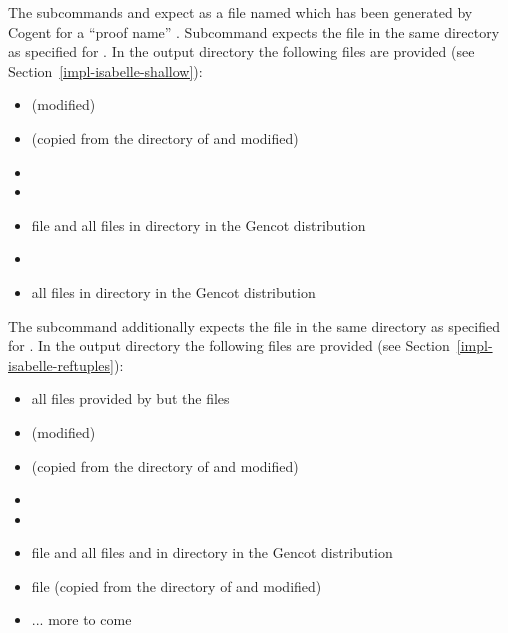 The subcommands  and  expect as  a file named  
which has been generated
by Cogent for a ``proof name'' . Subcommand  expects the file  in the same directory 
as specified for . In the output directory the following files are provided (see Section~\ref{impl-isabelle-shallow}):
\begin{itemize}
\item {} (modified)
\item {} (copied from the directory of  and modified)
\item {}
\item {}
\item file  and all files  in directory  in the Gencot distribution
\item {}
\item all files  in directory  in the Gencot distribution
\end{itemize}

The subcommand  additionally expects the file  in the same directory 
as specified for . In the output directory the following files are provided (see Section~\ref{impl-isabelle-reftuples}):
\begin{itemize}
\item all files provided by  but the  files
\item {} (modified)
\item {} (copied from the directory of  and modified)
\item {}
\item {}
\item file  and all files  and  
in directory  in the Gencot distribution
\item file  (copied from the directory of  and modified)
\item ... more to come
\end{itemize}

